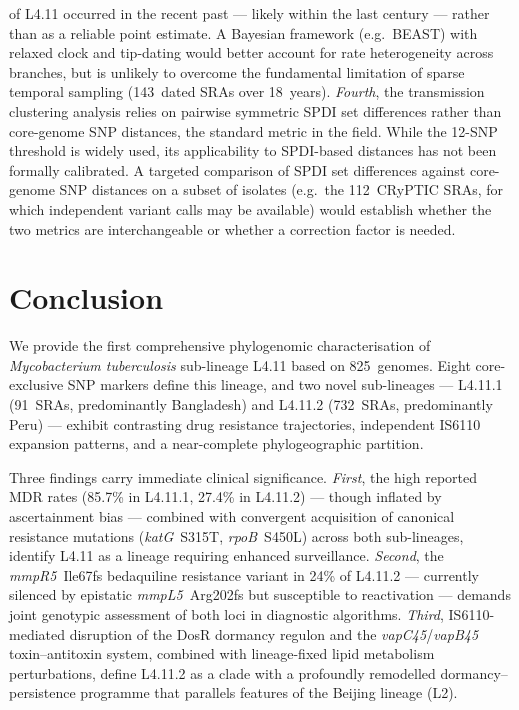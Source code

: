 \documentclass[11pt,a4paper]{article}
\newcommand{\mtb}{\textit{Mycobacterium tuberculosis}}
\newcommand{\lignee}[1]{\textsf{#1}}
\begin{document}
of \lignee{L4.11} occurred in the recent past --- likely within the
last century --- rather than as a reliable point estimate.
A Bayesian framework (e.g.\ BEAST) with relaxed clock and tip-dating
would better account for rate heterogeneity across branches, but is
unlikely to overcome the fundamental limitation of sparse temporal
sampling (143~dated SRAs over 18~years).
\emph{Fourth}, the transmission clustering analysis relies on
pairwise symmetric SPDI set differences rather than core-genome SNP
distances, the standard metric in the field.  While the 12-SNP threshold
is widely used, its applicability to SPDI-based distances has not been
formally calibrated.  A targeted comparison of SPDI set differences
against core-genome SNP distances on a subset of isolates (e.g.\ the
112~CRyPTIC SRAs, for which independent variant calls may be available)
would establish whether the two metrics are interchangeable or whether
a correction factor is needed.

\section{Conclusion}

We provide the first comprehensive phylogenomic characterisation of
\mtb{} sub-lineage \lignee{L4.11} based on 825~genomes.  Eight
core-exclusive SNP markers define this lineage, and two novel
sub-lineages --- \lignee{L4.11.1} (91~SRAs, predominantly Bangladesh)
and \lignee{L4.11.2} (732~SRAs, predominantly Peru) --- exhibit
contrasting drug resistance trajectories, independent IS6110 expansion
patterns, and a near-complete phylogeographic partition.

Three findings carry immediate clinical significance.
\emph{First}, the high reported MDR rates (85.7\% in \lignee{L4.11.1},
27.4\% in \lignee{L4.11.2}) --- though inflated by ascertainment bias ---
combined with convergent acquisition of canonical resistance mutations
(\textit{katG}~S315T, \textit{rpoB}~S450L) across both sub-lineages,
identify \lignee{L4.11} as a lineage requiring enhanced surveillance.
\emph{Second}, the \textit{mmpR5}~Ile67fs bedaquiline resistance variant
in 24\% of \lignee{L4.11.2} --- currently silenced by epistatic
\textit{mmpL5}~Arg202fs but susceptible to reactivation --- demands
joint genotypic assessment of both loci in diagnostic algorithms.
\emph{Third}, IS6110-mediated disruption of the DosR dormancy regulon
and the \textit{vapC45}/\textit{vapB45} toxin--antitoxin system, combined
with lineage-fixed lipid metabolism perturbations, define
\lignee{L4.11.2} as a clade with a profoundly remodelled
dormancy--persistence programme that parallels features of the Beijing
lineage (L2).
\end{document}
